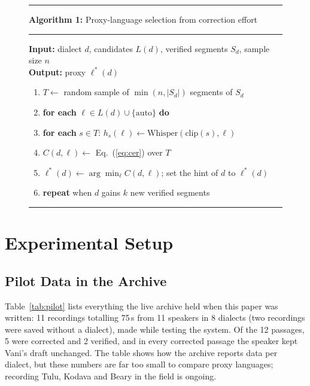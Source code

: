 \documentclass[conference]{IEEEtran}
\begin{document}
\begin{figure}[t]
\hrule\vspace{3pt}
\noindent\textbf{Algorithm 1:} Proxy-language selection from correction effort
\vspace{3pt}\hrule\vspace{4pt}
\small
\noindent\textbf{Input:} dialect $d$, candidates $L(d)$, verified segments $S_d$, sample size $n$\\
\textbf{Output:} proxy $\ell^{*}(d)$
\begin{enumerate}
\setlength{\itemsep}{1pt}
\item $T \leftarrow$ random sample of $\min(n, |S_d|)$ segments of $S_d$
\item \textbf{for each} $\ell \in L(d) \cup \{\text{auto}\}$ \textbf{do}
\item \quad \textbf{for each} $s \in T$: $h_s(\ell) \leftarrow \mathrm{Whisper}(\mathrm{clip}(s), \ell)$
\item \quad $C(d,\ell) \leftarrow$ Eq.~(\ref{eq:cer}) over $T$
\item $\ell^{*}(d) \leftarrow \arg\min_{\ell} C(d,\ell)$; set the hint of $d$ to $\ell^{*}(d)$
\item \textbf{repeat} when $d$ gains $k$ new verified segments
\end{enumerate}
\vspace{2pt}\hrule
\end{figure}

\section{Experimental Setup}\label{sec:setup}
\subsection{Pilot Data in the Archive}
Table~\ref{tab:pilot} lists everything the live archive held when this paper was written: 11 recordings totalling 75\,s from 11 speakers in 8 dialects (two recordings were saved without a dialect), made while testing the system. Of the 12 passages, 5 were corrected and 2 verified, and in every corrected passage the speaker kept Vani's draft unchanged. The table shows how the archive reports data per dialect, but these numbers are far too small to compare proxy languages; recording Tulu, Kodava and Beary in the field is ongoing.
\end{document}
